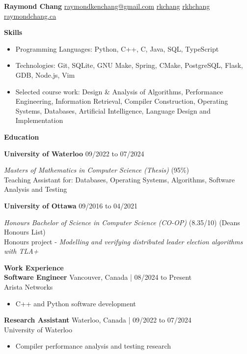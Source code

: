 \documentclass[10pt]{article}
\begin{document}
{\huge\textbf{Raymond Chang}} \space\space
{} \href{mailto:raymondkenchang@gmail.com}{raymondkenchang@gmail.com}  \space\space
{} \href{https://github.com/rkchang}{rkchang} \space\space
{} \href{https://linkedin.com/in/rkhchang}{rkhchang} \space\space
{} \href{https://raymondchang.ca/}{raymondchang.ca}

\bigskip

{\Large\textbf{Skills}}\space \hrulefill
\begin{itemize}
    \item Programming Languages: Python, C++, C, Java, SQL, TypeScript
    \item Technologies: Git, SQLite, GNU Make, Spring, CMake, PostgreSQL, Flask, GDB, Node.js, Vim
    \item Selected course work: Design \& Analysis of Algorithms, Performance Engineering, Information Retrieval, Compiler Construction, Operating Systems, Databases, Artificial Intelligence, Language Design and Implementation
\end{itemize}

\smallskip

{\Large\textbf{Education}}\space \hrulefill

\textbf{University of Waterloo} \hfill  09/2022 to 07/2024

\textit{Masters of Mathematics in Computer Science (Thesis)} (95\%) \\
Teaching Assistant for: Databases, Operating Systems, Algorithms, Software Analysis and Testing

\textbf{University of Ottawa} \hfill 09/2016 to 04/2021

\textit{Honours Bachelor of Science in Computer Science (CO-OP)} (8.35/10) (Deans Honours List) \\
Honours project - \textit{Modelling and verifying distributed leader election algorithms with TLA+}

\smallskip

{\Large\textbf{Work Experience}}\space \hrulefill \\
\textbf{Software Engineer} \hfill Vancouver, Canada | 08/2024 to Present \\
Arista Networks
\begin{itemize}
    \item C++ and Python software development
\end{itemize}
\textbf{Research Assistant} \hfill Waterloo, Canada | 09/2022 to 07/2024 \\
University of Waterloo
\begin{itemize}
    \item Compiler performance analysis and testing research
\end{itemize}
\end{document}
